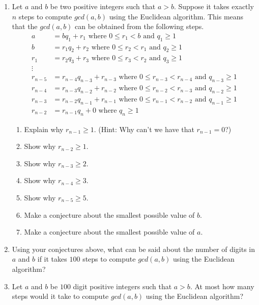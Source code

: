\documentclass[12pt]{amsart}
\theoremstyle{definition}
\theoremstyle{remark}
\numberwithin{equation}{section}
\begin{document}
\begin{enumerate}
\item Let $a$ and $b$ be two positive integers such that $a>b$. Suppose it takes exactly $n$ steps to compute $gcd(a,b)$ using the Euclidean algorithm. This means that the $gcd(a,b)$ can be obtained from the following steps.
\begin{align*}
a&=bq_1+r_1 \text{ where } 0\leq r_1< b\text{ and } q_1\geq 1\\
b&=r_1q_2+r_2 \text{ where } 0\leq r_2< r_1\text{ and } q_2\geq 1\\
r_1&=r_2q_3+r_3 \text{ where } 0\leq r_3< r_2\text{ and } q_3\geq 1\\
\vdots\\
r_{n-5}&=r_{n-4}q_{n-3}+r_{n-3} \text{ where } 0\leq r_{n-3}< r_{n-4}\text{ and } q_{n-3}\geq 1\\
r_{n-4}&=r_{n-3}q_{n-2}+r_{n-2} \text{ where } 0\leq r_{n-2}< r_{n-3}\text{ and } q_{n-2}\geq 1\\
r_{n-3}&=r_{n-2}q_{n-1}+r_{n-1} \text{ where } 0\leq r_{n-1}< r_{n-2}\text{ and } q_{n-1}\geq 1\\
r_{n-2}&=r_{n-1}q_{n}+0 \text{ where } q_n\geq 1
\end{align*}
\begin{enumerate}
\item Explain why $r_{n-1}\geq 1$. (Hint: Why can't we have that $r_{n-1}=0$?)
\item Show why $r_{n-2}\geq 1$.
\item Show why $r_{n-3}\geq 2$.
\item Show why $r_{n-4}\geq 3$.
\item Show why $r_{n-5}\geq 5$.
\item Make a conjecture about the smallest possible value of $b$.
\item Make a conjecture about the smallest possible value of $a$.
\end{enumerate}

\item Using your conjectures above, what can be said about the number of digits in $a$ and $b$ if it takes $100$ steps to compute $gcd(a,b)$ using the Euclidean algorithm?

\item Let $a$ and $b$ be $100$ digit positive integers such that $a>b$. At most how many steps would it take to compute $gcd(a,b)$ using the Euclidean algorithm?

\end{enumerate}
\vfill
\end{document}
